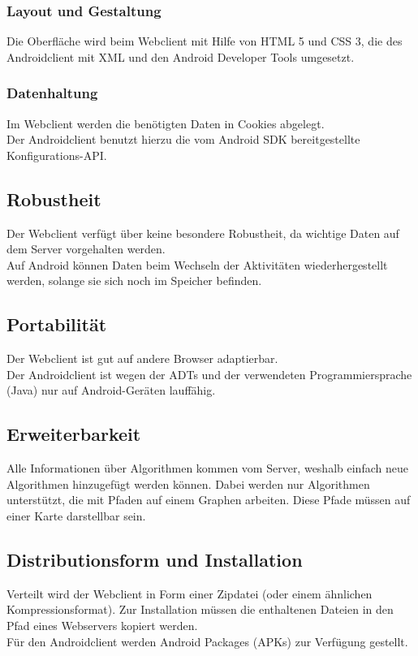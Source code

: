 \documentclass[a4paper,10pt,titlepage]{article}
\begin{document}
\subsubsection{Layout und Gestaltung}
Die Oberfläche wird beim Webclient mit Hilfe von HTML 5 und CSS 3, die des Androidclient mit XML und den Android Developer Tools umgesetzt.

\subsubsection{Datenhaltung} \label{datenhaltung}
Im Webclient werden die benötigten Daten in Cookies abgelegt.\\
Der Androidclient benutzt hierzu die vom Android SDK bereitgestellte Konfigurations-API.

\subsection{Robustheit}
Der Webclient verfügt über keine besondere Robustheit, da wichtige Daten auf dem Server vorgehalten werden.\\
Auf Android können Daten beim Wechseln der Aktivitäten wiederhergestellt werden, solange sie sich noch im Speicher befinden.

\subsection{Portabilität}
Der Webclient ist gut auf andere Browser adaptierbar.\\
Der Androidclient ist wegen der ADTs und der verwendeten Programmiersprache (Java) nur auf Android-Geräten lauffähig.

\subsection{Erweiterbarkeit}
Alle Informationen über Algorithmen kommen vom Server, weshalb einfach neue Algorithmen hinzugefügt werden können.
Dabei werden nur Algorithmen unterstützt, die mit Pfaden auf einem Graphen arbeiten. Diese Pfade müssen auf einer Karte darstellbar sein.

\subsection{Distributionsform und Installation}
Verteilt wird der Webclient in Form einer Zipdatei (oder einem ähnlichen Kompressionsformat). Zur Installation müssen die enthaltenen Dateien in den Pfad eines Webservers kopiert werden.\\
Für den Androidclient werden Android Packages (APKs) zur Verfügung gestellt.
\end{document}

